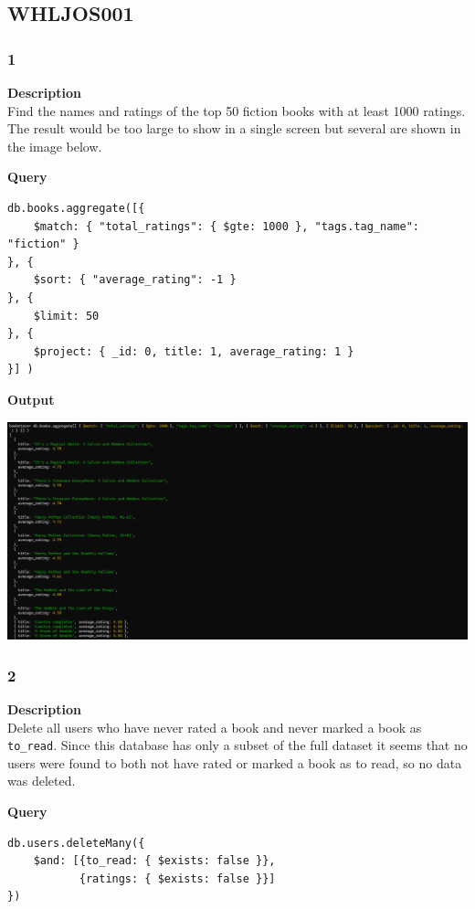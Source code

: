 \documentclass[11pt]{article}
\begin{document}
\subsection{WHLJOS001}
\label{sec:org8a98154}
\subsubsection{1}
\label{sec:org8056b8b}
\textbf{Description}\\
Find the names and ratings of the top 50 fiction books with at least 1000 ratings. The result would be too large to show in a single screen but several are shown in the image below.

\linebreak
\textbf{Query}
\begin{verbatim}
db.books.aggregate([{
    $match: { "total_ratings": { $gte: 1000 }, "tags.tag_name": "fiction" }
}, {
    $sort: { "average_rating": -1 }
}, {
    $limit: 50
}, {
    $project: { _id: 0, title: 1, average_rating: 1 }
}] )
\end{verbatim}
\linebreak
\textbf{Output}\\
\begin{center}
\includegraphics[width=1\textwidth]{images/WHLJOS001/1.png}
\end{center}
\pagebreak
\subsubsection{2}
\label{sec:org4654213}
\textbf{Description}\\
Delete all users who have never rated a book and never marked a book as \texttt{to\_read}. Since this database has only a subset of the full dataset it seems that no users were found to both not have rated or marked a book as to read, so no data was deleted.

\linebreak
\textbf{Query}
\begin{verbatim}
db.users.deleteMany({
    $and: [{to_read: { $exists: false }},
           {ratings: { $exists: false }}]
})
\end{verbatim}
\end{document}

